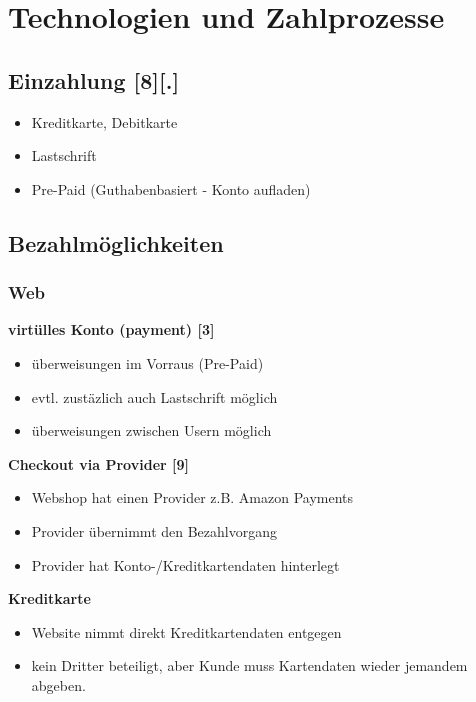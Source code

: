 \section{Technologien und Zahlprozesse}

\subsection{ Einzahlung [8][.]}
        \begin{itemize}
        \item Kreditkarte, Debitkarte
        \item Lastschrift
        \item Pre-Paid (Guthabenbasiert - Konto aufladen)
        \end{itemize}


\subsection{ Bezahlmöglichkeiten}
\subsubsection{ Web}
\textbf{ virtülles Konto (payment) [3]}\\
        \begin{itemize}
        \item überweisungen im Vorraus (Pre-Paid)
        \item evtl. zustäzlich auch Lastschrift möglich
        \item überweisungen zwischen Usern möglich
        \end{itemize}

\textbf{ Checkout via Provider [9]}\\
        \begin{itemize}
        \item Webshop hat einen Provider z.B. Amazon Payments
        \item Provider übernimmt den Bezahlvorgang
        \item Provider hat Konto-/Kreditkartendaten hinterlegt
        \end{itemize}

\textbf{ Kreditkarte}\\
        \begin{itemize}
        \item Website nimmt direkt Kreditkartendaten entgegen
        \item kein Dritter beteiligt, aber Kunde muss Kartendaten wieder jemandem abgeben.
        \end{itemize}

